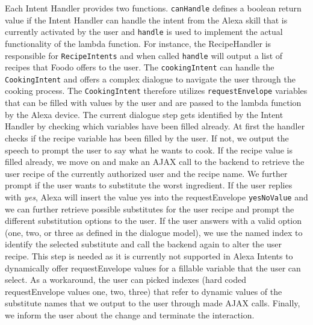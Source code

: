 Each Intent Handler provides two functions. \texttt{canHandle} defines a boolean return value if the Intent Handler can handle the intent from the Alexa skill that is currently activated by the user and \texttt{handle} is used to implement the actual functionality of the lambda function. For instance, the RecipeHandler is responsible for \texttt{RecipeIntents} and when called \texttt{handle} will output a list of recipes that Foodo offers to the user. The \texttt{cookingIntent} can handle the \texttt{CookingIntent} and offers a complex dialogue to navigate the user through the cooking process. The \texttt{CookingIntent} therefore utilizes \texttt{requestEnvelope} variables that can be filled with values by the user and are passed to the lambda function by the Alexa device. The current dialogue step gets identified by the Intent Handler by checking which variables have been filled already. At first the handler checks if the recipe variable has been filled by the user. If not, we output the speech to prompt the user to say what he wants to cook. If the recipe value is filled already, we move on and make an AJAX call to the backend to retrieve the user recipe of the currently authorized user and the recipe name. We further prompt if the user wants to substitute the worst ingredient. If the user replies with \textit{yes}, Alexa will insert the value yes into the requestEnvelope \texttt{yesNoValue} and we can further retrieve possible substitutes for the user recipe and prompt the different substitution options to the user. If the user answers with a valid option (one, two, or three as defined in the dialogue model), we use the named index to identify the selected substitute and call the backend again to alter the user recipe. This step is needed as it is currently not supported in Alexa Intents to dynamically offer requestEnvelope values for a fillable variable that the user can select. As a workaround, the user can picked indexes (hard coded requestEnvelope values one, two, three) that refer to dynamic values of the substitute names that we output to the user through made AJAX calls.
Finally, we inform the user about the change and terminate the interaction. 

